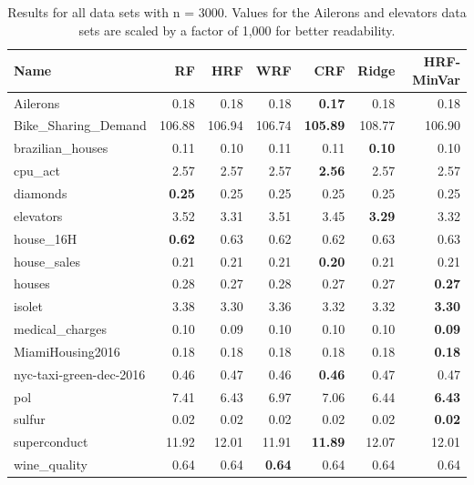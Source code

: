 \begin{table}[ht]
\centering
\begingroup\scriptsize
\begin{tabular}{lrrrrrr}
  \hline
\textbf{ Name } & \textbf{ RF } & \textbf{ HRF } & \textbf{ WRF } & \textbf{ CRF } & \textbf{ Ridge } & \textbf{ HRF-MinVar } \\ 
  \hline
Ailerons & 0.18 & 0.18 & 0.18 & \textbf{0.17} & 0.18 & 0.18 \\ 
  Bike\_Sharing\_Demand & 106.88 & 106.94 & 106.74 & \textbf{105.89} & 108.77 & 106.90 \\ 
  brazilian\_houses & 0.11 & 0.10 & 0.11 & 0.11 & \textbf{0.10} & 0.10 \\ 
  cpu\_act & 2.57 & 2.57 & 2.57 & \textbf{2.56} & 2.57 & 2.57 \\ 
  diamonds & \textbf{0.25} & 0.25 & 0.25 & 0.25 & 0.25 & 0.25 \\ 
  elevators & 3.52 & 3.31 & 3.51 & 3.45 & \textbf{3.29} & 3.32 \\ 
  house\_16H & \textbf{0.62} & 0.63 & 0.62 & 0.62 & 0.63 & 0.63 \\ 
  house\_sales & 0.21 & 0.21 & 0.21 & \textbf{0.20} & 0.21 & 0.21 \\ 
  houses & 0.28 & 0.27 & 0.28 & 0.27 & 0.27 & \textbf{0.27} \\ 
  isolet & 3.38 & 3.30 & 3.36 & 3.32 & 3.32 & \textbf{3.30} \\ 
  medical\_charges & 0.10 & 0.09 & 0.10 & 0.10 & 0.10 & \textbf{0.09} \\ 
  MiamiHousing2016 & 0.18 & 0.18 & 0.18 & 0.18 & 0.18 & \textbf{0.18} \\ 
  nyc-taxi-green-dec-2016 & 0.46 & 0.47 & 0.46 & \textbf{0.46} & 0.47 & 0.47 \\ 
  pol & 7.41 & 6.43 & 6.97 & 7.06 & 6.44 & \textbf{6.43} \\ 
  sulfur & 0.02 & 0.02 & 0.02 & 0.02 & 0.02 & \textbf{0.02} \\ 
  superconduct & 11.92 & 12.01 & 11.91 & \textbf{11.89} & 12.07 & 12.01 \\ 
  wine\_quality & 0.64 & 0.64 & \textbf{0.64} & 0.64 & 0.64 & 0.64 \\ 
   \hline
\end{tabular}
\endgroup
\caption{Results for all data sets with n = 3000. Values for the Ailerons and elevators data sets are scaled by a factor of 1,000 for better readability.} 
\end{table}
